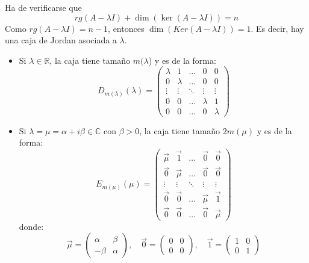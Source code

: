 Ha de verificarse que
$$rg(A - \lambda I) + \dim(\ker(A - \lambda I)) = n$$
Como $rg(A - \lambda I) = n-1$, entonces $\dim(Ker(A - \lambda I)) = 1$.
Es decir, hay una caja de Jordan asociada a $\lambda$.
\begin{itemize}
    \item Si $\lambda \in \mathbb{R}$, la caja tiene tamaño $m(\lambda$) y es de la forma:
          $$D_{m(\lambda)}(\lambda) =
              \begin{pmatrix}
                  \lambda & 1       & \dots  & 0       & 0       \\
                  0       & \lambda & \dots  & 0       & 0       \\
                  \vdots  & \vdots  & \ddots & \vdots  & \vdots  \\
                  0       & 0       & \dots  & \lambda & 1       \\
                  0       & 0       & \dots  & 0       & \lambda
              \end{pmatrix}$$
    \item Si $\lambda = \mu = \alpha + i\beta \in \mathbb{C}$ con $\beta > 0$, la caja tiene tamaño $2m(\mu)$ y es de la forma:
          $$E_{m(\mu)}(\mu) = \begin{pmatrix}
                  \vec{\mu} & \vec{1}   & \dots  & \vec{0}   & \vec{0}   \\
                  \vec{0}   & \vec{\mu} & \dots  & \vec{0}   & \vec{0}   \\
                  \vdots    & \vdots    & \ddots & \vdots    & \vdots    \\
                  \vec{0}   & \vec{0}   & \dots  & \vec{\mu} & \vec{1}   \\
                  \vec{0}   & \vec{0}   & \dots  & \vec{0}   & \vec{\mu}
              \end{pmatrix}$$
          donde:
          $$\vec{\mu} = \begin{pmatrix}
                  \alpha & \beta  \\
                  -\beta & \alpha
              \end{pmatrix}, \quad
              \vec{0} = \begin{pmatrix}
                  0 & 0 \\
                  0 & 0
              \end{pmatrix}, \quad
              \vec{1} = \begin{pmatrix}
                  1 & 0 \\
                  0 & 1
              \end{pmatrix}$$
\end{itemize}

